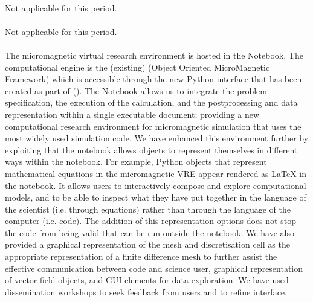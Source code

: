 \documentclass{deliverablereport}
\begin{document}
\paragraph{} %

Not applicable for this period.

\paragraph{} %

Not applicable for this period.

\paragraph{} %

The micromagnetic virtual research environment is hosted in the \Jupyter
Notebook. The computational engine is the (existing) \OOMMF (Object Oriented
MicroMagnetic Framework) which is accessible through the new Python interface
that has been created as part of \ODK  
(). The \Jupyter Notebook allows us to
integrate the problem specification, the execution of the calculation, and the
postprocessing and data representation within a single executable document;
providing a new computational research environment for micromagnetic
simulation that uses the most widely used simulation code. We have enhanced
this environment further by exploiting that the notebook allows objects to
represent themselves in different ways within the notebook. For example,
Python objects that represent mathematical equations in the micromagnetic VRE
appear rendered as \LaTeX{} in the notebook. It allows users to interactively
compose and explore computational models, and to be able to inspect what they
have put together in the language of the scientist (i.e. through equations)
rather than through the language of the computer (i.e. code). The addition of
this representation options does not stop the code from being valid \Python
that can be run outside the notebook. We have also provided a graphical
representation of the mesh and discretisation cell as the appropriate
representation of a finite difference mesh to further assist the effective
communication between code and science user, graphical representation of
vector field objects, and GUI elements for data exploration. We have used dissemination workshops 
to seek feedback from users and to refine interface.
\end{document}
